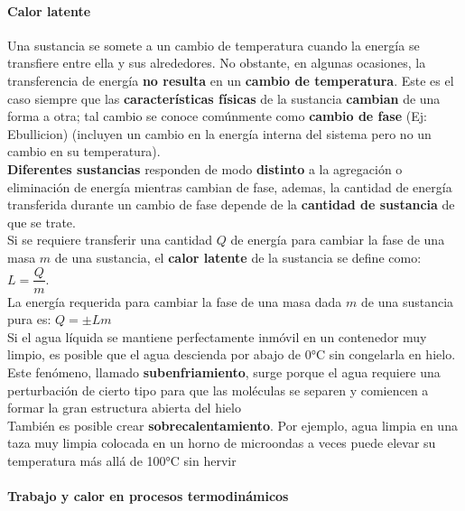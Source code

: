 \documentclass[10pt]{article}
\begin{document}
\paragraph{Calor latente}

Una sustancia se somete a un cambio de temperatura cuando la energía se transfiere entre ella y sus alrededores. No obstante, en algunas ocasiones, la transferencia de energía \textbf{no resulta} en un \textbf{cambio de temperatura}. Este es el caso siempre que las \textbf{características físicas} de la sustancia \textbf{cambian} de una forma a otra; tal cambio se conoce comúnmente como \textbf{cambio de fase} (Ej: Ebullicion) (incluyen un cambio en la energía interna del sistema pero no un cambio en su temperatura).\\
\linebreak
\textbf{Diferentes sustancias} responden de modo \textbf{distinto} a la agregación o eliminación de energía mientras cambian de fase, ademas, la cantidad de energía transferida durante un cambio de fase depende de la \textbf{cantidad de sustancia} de que se trate.\\
\linebreak
Si se requiere transferir una cantidad $Q$ de energía para cambiar la fase de una masa $m$ de una sustancia, el \textbf{calor latente} de la sustancia se define como: $L = \dfrac{Q}{m}$.\\
\linebreak
La energía requerida para cambiar la fase de una masa dada $m$ de una sustancia pura es: $Q = \pm Lm$\\
\linebreak
Si el agua líquida se mantiene perfectamente inmóvil en un contenedor muy limpio, es posible que el agua descienda por abajo de 0°C sin congelarla en hielo. Este fenómeno, llamado \textbf{subenfriamiento}, surge porque el agua requiere una perturbación de cierto tipo para que las moléculas se separen y comiencen a formar la gran estructura abierta del hielo\\
También es posible crear \textbf{sobrecalentamiento}. Por ejemplo, agua limpia en una taza muy limpia colocada en un horno de microondas a veces puede elevar su temperatura más allá de 100°C sin hervir

\paragraph{Trabajo y calor en procesos termodinámicos}
\end{document}
